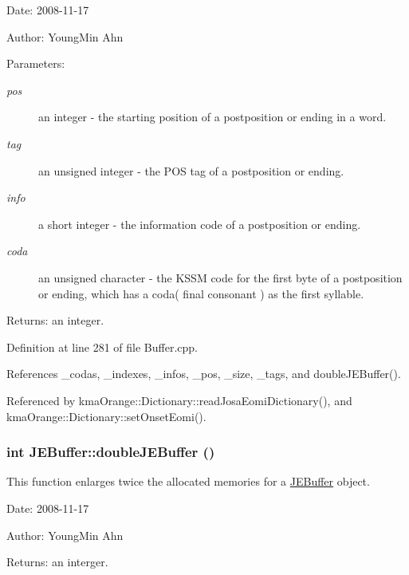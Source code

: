 \begin{Desc}
\item[Date:]2008-11-17 \end{Desc}
\begin{Desc}
\item[Author:]YoungMin Ahn \end{Desc}
\begin{Desc}
\item[Parameters:]
\begin{description}
\item[{\em pos}]an integer - the starting position of a postposition or ending in a word. \item[{\em tag}]an unsigned integer - the POS tag of a postposition or ending. \item[{\em info}]a short integer - the information code of a postposition or ending. \item[{\em coda}]an unsigned character - the KSSM code for the first byte of a postposition or ending, which has a coda( final consonant ) as the first syllable. \end{description}
\end{Desc}
\begin{Desc}
\item[Returns:]an integer. \end{Desc}


Definition at line 281 of file Buffer.cpp.

References \_\-codas, \_\-indexes, \_\-infos, \_\-pos, \_\-size, \_\-tags, and doubleJEBuffer().

Referenced by kmaOrange::Dictionary::readJosaEomiDictionary(), and kmaOrange::Dictionary::setOnsetEomi().\hypertarget{classkmaOrange_1_1JEBuffer_7a5fb7133ad58c60dafd9e9ab5c1158b}{
\subsubsection[{doubleJEBuffer}]{\setlength{\rightskip}{0pt plus 5cm}int JEBuffer::doubleJEBuffer ()}}
\label{classkmaOrange_1_1JEBuffer_7a5fb7133ad58c60dafd9e9ab5c1158b}


This function enlarges twice the allocated memories for a \hyperlink{classkmaOrange_1_1JEBuffer}{JEBuffer} object. 

\begin{Desc}
\item[Date:]2008-11-17 \end{Desc}
\begin{Desc}
\item[Author:]YoungMin Ahn \end{Desc}
\begin{Desc}
\item[Returns:]an interger. \end{Desc}


